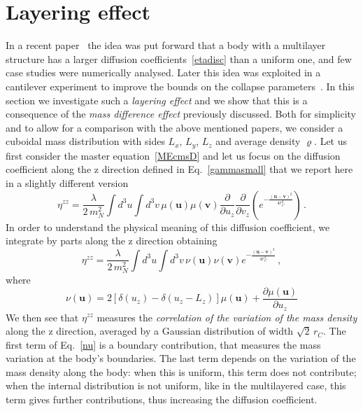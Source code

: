\documentclass[11pt,onecolumn,amssymb,nofootinbib]{revtex4}
\newcommand\beq{\begin{equation}}
\newcommand\eeq{\end{equation}}
\begin{document}
\section{Layering effect}
In a recent paper~\cite{CarVinBas18} the idea was put forward that a body with a multilayer structure has a larger diffusion coefficients~\eqref{etadisc} than a uniform one, and few case studies were numerically analysed. Later this idea was exploited in a cantilever experiment to improve the bounds on the collapse parameters~\cite{lay-exp}. In this section we investigate such a \emph{layering effect} and we show that this is a consequence of the \emph{mass difference effect} previously discussed. Both for simplicity and to allow for a comparison with the above mentioned papers, we consider a cuboidal mass distribution with sides $L_x$, $L_y$, $L_z$ and average density $\varrho$.
Let us first consider the master equation~\eqref{MEcmsD} and let us focus on the diffusion coefficient along the z direction defined in Eq.~\eqref{gammasmall} that we report here in a slightly different version
\beq%
\eta^{zz}=\frac{\lambda}{2\,m_N^2}\int d^3u\int d^3v\,\mu(\boldsymbol{u}) \mu(\boldsymbol{v}) \frac{\partial}{\partial u_z}\frac{\partial}{\partial v_z} \left(e^{-\frac{(\boldsymbol{u}-\boldsymbol{v})^2}{4r_C^2}}\right)\,.
\eeq
In order to understand the physical meaning of this diffusion coefficient, we integrate by parts along the z direction obtaining
\beq\label{etazzvar}
\eta^{zz}=\frac{\lambda}{2\,m_N^2}\int d^3u\int d^3v\, \nu(\boldsymbol{u})\nu(\boldsymbol{v}) e^{-\frac{(\boldsymbol{u}-\boldsymbol{v})^2}{4r_C^2}}\,,
\eeq
where
\beq\label{nu}
\nu(\boldsymbol{u})=2 [\delta(u_z)-\delta(u_z-L_z)]\mu(\boldsymbol{u})+\frac{\partial \mu(\boldsymbol{u})}{\partial u_z}
\eeq
We then see that $\eta^{zz}$ measures the \emph{correlation of the variation of the mass density} along the z direction, averaged by a Gaussian distribution of width $\sqrt{2}\,r_C$. The first term of Eq.~\eqref{nu} is a boundary contribution, that measures the mass variation at the body's boundaries. %
The last term depends on the  variation of the mass density along the body: when this is uniform, this term does not contribute; when the internal distribution is not uniform, like in the multilayered case, this term gives further contributions, thus increasing the diffusion coefficient.
\end{document}
